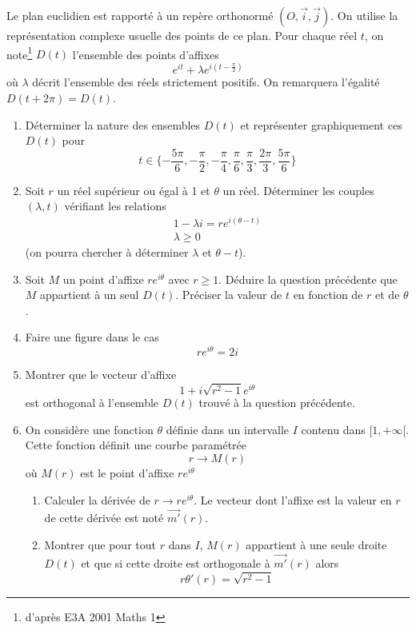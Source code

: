 Le plan euclidien est rapporté à un repère orthonormé $(O,\overrightarrow{i},\overrightarrow{j})$. On utilise la représentation complexe usuelle des points de ce plan.
Pour chaque réel $t$, on note\footnote{d'après E3A 2001 Maths 1} $D(t)$ l'ensemble des points d'affixes
\[e^{it}+\lambda e^{i(t-\frac{\pi}{2})}\]
où $\lambda$ décrit l'ensemble des réels strictement positifs. On remarquera l'égalité $D(t+2\pi)=D(t)$.

\begin{enumerate}
\item Déterminer la nature des ensembles $D(t)$ et représenter graphiquement ces $D(t)$ pour
\[t \in \{-\frac{5\pi}{6},-\frac{\pi}{2},-\frac{\pi}{4},\frac{\pi}{6},\frac{\pi}{3},\frac{2\pi}{3},\frac{5\pi}{6}\}\]
\item Soit $r$ un réel supérieur ou égal à 1 et $\theta$ un réel. Déterminer les couples $(\lambda,t)$ vérifiant les relations
\begin{eqnarray*}
1-\lambda i = r e^{i(\theta - t)}\\
\lambda \geq 0
\end{eqnarray*}
(on pourra chercher à déterminer $\lambda$ et $\theta -t$).
\item Soit $M$ un point d'affixe $re^{i\theta}$ avec $r\geq1$. Déduire la question précédente que $M$ appartient à un seul $D(t)$. Préciser la valeur de $t$ en fonction de $r$ et de $\theta$.
\item Faire une figure dans le cas
\[re^{i\theta}=2i\]
\item Montrer que le vecteur d'affixe
\[1+i\sqrt{r^2-1}e^{i\theta}\]
est orthogonal à l'ensemble $D(t)$ trouvé à la question précédente.
\item On considère une fonction $\theta$ définie dans un intervalle $I$ contenu dans $[1,+\infty[$. Cette fonction définit une courbe paramétrée
\[r\rightarrow M(r)\]
où $M(r)$ est le point d'affixe $re^{i\theta}$
\begin{enumerate}
\item Calculer la dérivée de $r\rightarrow re^{i\theta}$. Le vecteur dont l'affixe est la valeur en $r$ de cette dérivée est noté $\overrightarrow{m'}(r)$.
\item Montrer que pour tout $r$ dans $I$, $M(r)$ appartient à une seule droite $D(t)$ et que si cette droite est orthogonale à $\overrightarrow{m'}(r)$ alors
\[r\theta'(r)=\sqrt{r^2-1}\]
\end{enumerate}
\end{enumerate}
